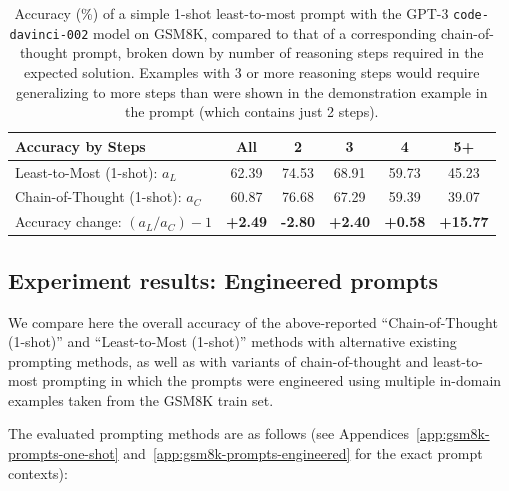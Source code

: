 \begin{table}[h!]
\centering
\begin{tabular}{ |l|c|c|c|c|c|}
\hline
\textbf{Accuracy by Steps} & \textbf{All} & \textbf{2} & \textbf{3} & \textbf{4} & \textbf{5+}  \\
  \hline
Least-to-Most (1-shot): $a_L$ & 62.39 & 74.53 & 68.91 & 59.73 & 45.23 \\
  \hline
Chain-of-Thought (1-shot): $a_C$ & 60.87 & 76.68 & 67.29 & 59.39 & 39.07 \\
  \hline
Accuracy change: $(a_L / a_C) - 1$ & \textcolor{good}{\textbf{+2.49}} & \textcolor{bad}{\textbf{-2.80}} & \textcolor{good}{\textbf{+2.40}} & \textcolor{good}{\textbf{+0.58}} & \textcolor{good}{\textbf{+15.77}} \\
\hline
\end{tabular}
\vspace{5pt}
\caption{Accuracy (\%) of a simple 1-shot least-to-most prompt with the GPT-3 \texttt{code-davinci-002} model on GSM8K, compared to that of a corresponding chain-of-thought prompt, broken down by number of reasoning steps required in the expected solution. Examples with 3 or more reasoning steps would require generalizing to more steps than were shown in the demonstration example in the prompt (which contains just 2 steps).}
\label{table: gsm8k-results-breakdown}
\end{table}
\subsection{Experiment results: Engineered prompts}
\label{app:gsm8k-results-engineered}

We compare here the overall accuracy of the above-reported ``Chain-of-Thought (1-shot)'' and ``Least-to-Most (1-shot)'' methods with alternative existing prompting methods, as well as with variants of chain-of-thought and least-to-most prompting in which the prompts were engineered using multiple in-domain examples taken from the GSM8K train set.

The evaluated prompting methods are as follows (see Appendices~\ref{app:gsm8k-prompts-one-shot} and~\ref{app:gsm8k-prompts-engineered} for the exact prompt contexts):

